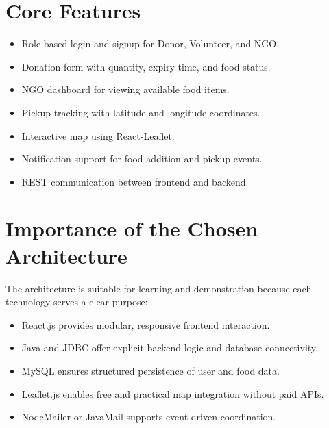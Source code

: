 \documentclass[12pt,a4paper]{report}
\begin{document}
\section{Core Features}
\begin{itemize}[leftmargin=1.2cm]
\item Role-based login and signup for Donor, Volunteer, and NGO.
\item Donation form with quantity, expiry time, and food status.
\item NGO dashboard for viewing available food items.
\item Pickup tracking with latitude and longitude coordinates.
\item Interactive map using React-Leaflet.
\item Notification support for food addition and pickup events.
\item REST communication between frontend and backend.
\end{itemize}

\section{Importance of the Chosen Architecture}
The architecture is suitable for learning and demonstration because each technology serves a clear purpose:
\begin{itemize}[leftmargin=1.2cm]
\item React.js provides modular, responsive frontend interaction.
\item Java and JDBC offer explicit backend logic and database connectivity.
\item MySQL ensures structured persistence of user and food data.
\item Leaflet.js enables free and practical map integration without paid APIs.
\item NodeMailer or JavaMail supports event-driven coordination.
\end{itemize}
\end{document}

